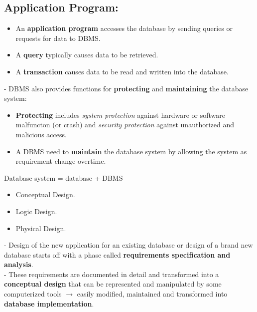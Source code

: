 \documentclass[10pt]{article}
\begin{document}
\subsection{Application Program:}
	\begin{itemize}
		\item An \textbf{application program} accesses the database by sending queries or requests for data to DBMS.
		\item A \textbf{query} typically causes data to be retrieved.
		\item A \textbf{transaction} causes data to be read and written into the database.
	\end{itemize}

	- DBMS also provides functions for \textbf{protecting} and \textbf{maintaining} the database system:
	\begin{itemize}
		\item \textbf{Protecting} includes \textit{system protection} against hardware or software malfuncton (or crash) and \textit{security protection} against unauthorized and malicious access. 
		\item A DBMS need to \textbf{maintain} the database system by allowing the system as requirement change overtime.
	\end{itemize}

\bigbreak
\begin{mybox}
	\begin{center}
		Database system = database + DBMS
	\end{center}
\end{mybox}
	
	\bigbreak
	\begin{itemize}
		\item Conceptual Design.
		\item Logic Design.
		\item Physical Design.
	\end{itemize}

	- Design of the new application for an existing database or design of a brand new database starts off with a phase called \textbf{requirements specification and analysis}. \\

	- These requirements are documented in detail and transformed into a \textbf{conceptual design} that can be represented and manipulated by some computerized tools $\rightarrow$ easily modified, maintained and transformed into \textbf{database implementation}. \\
\end{document}
